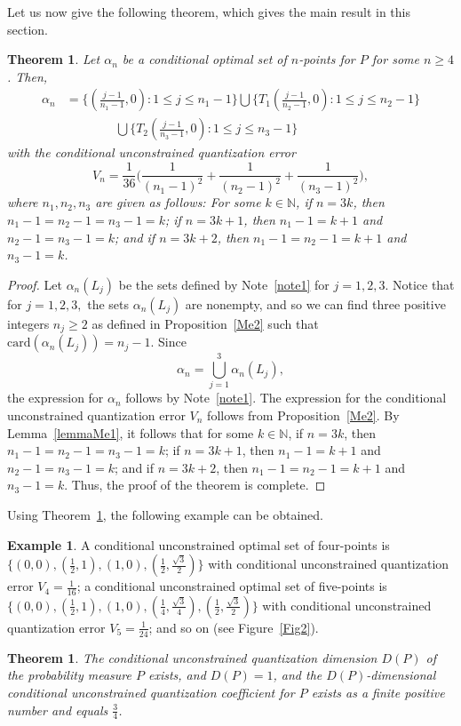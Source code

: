 \documentclass[12pt, reqno]{amsart}
\theoremstyle{plain}
\newtheorem{theorem}[subsection]{Theorem}
\newtheorem{theo}[subsection]{Theorem}
\theoremstyle{definition}
\newtheorem{exam}[subsection]{Example}
\newcommand{\UU}{\bigcup}%
\newcommand{\set}[1]{\{#1\}}%
\newcommand{\ga}{\alpha}
\newcommand{\D}[1]{\mathbb{#1}}%
\newcommand{\te}{\text}%
\begin{document}
Let us now give the following theorem, which gives the main result in this section. 
\begin{theo}\label{theo2}
Let $\ga_n$ be a conditional optimal set of $n$-points for $P$ for some $n\geq 4$. Then, 
\begin{align*}
\ga_n&=\Big\{(\frac{j-1}{n_1-1}, 0) : 1\leq j\leq n_1-1\Big\}\UU \Big\{T_1(\frac{j-1}{n_2-1}, 0) : 1\leq j\leq n_2-1\Big\}\\
&\qquad \qquad \UU\Big\{T_2(\frac{j-1}{n_3-1}, 0) : 1\leq j\leq n_3-1\Big\}
\end{align*} 
with the conditional unconstrained quantization error 
\[V_n=\frac{1}{36} \Big(\frac 1{(n_1-1)^2}+\frac 1{(n_2-1)^2}+\frac 1{(n_3-1)^2}\Big),\]
where $n_1, n_2, n_3$ are given as follows: For some $k\in \D N$, if $n=3k$, then $n_1-1=n_2-1=n_3-1=k$; if $n=3k+1$, then $n_1-1=k+1$ and $n_2-1=n_3-1=k$; and if $n=3k+2$, then $n_1-1=n_2-1=k+1$ and $n_3-1=k$. 
 \end{theo}
\begin{proof}
Let $\ga_n(L_j)$ be the sets defined by Note~\ref{note1} for $j=1, 2, 3$. Notice that for $j=1, 2, 3,$ the sets $\ga_n(L_j)$ are nonempty, and so we can find three positive integers $n_j\geq 2$ as defined in Proposition~\ref{Me2} such that $\te{card}(\ga_n(L_j))=n_j-1$.  Since 
\[\ga_n=\UU_{j=1}^3\ga_n(L_j),\]
the expression for $\ga_n$ follows by Note~\ref{note1}. The expression for the conditional unconstrained quantization error $V_n$ follows from Proposition~\ref{Me2}. By Lemma~\ref{lemmaMe1}, it follows that for some $k\in \D N$, if $n=3k$, then $n_1-1=n_2-1=n_3-1=k$; if $n=3k+1$, then $n_1-1=k+1$ and $n_2-1=n_3-1=k$; and if $n=3k+2$, then $n_1-1=n_2-1=k+1$ and $n_3-1=k$.  Thus, the proof of the theorem is complete. 
\end{proof}

Using Theorem~\ref{theo2}, the following example can be obtained. 
 \begin{exam} 
A conditional unconstrained optimal set of four-points is $\set{(0, 0), (\frac 12, 1), (1, 0), (\frac 12, \frac{\sqrt 3}2)}$ with conditional unconstrained quantization error $V_4=\frac 1 {16}$; a conditional unconstrained optimal set of five-points is $\set{(0, 0), (\frac 12, 1), (1, 0), (\frac 1 4, \frac{\sqrt 3}4), (\frac 12, \frac{\sqrt 3}2)}$ with conditional unconstrained quantization error $V_5=\frac 1 {24}$; and so on (see Figure~\ref{Fig2}).
 \end{exam} 
 
\begin{theorem}\label{theo3} 
The conditional unconstrained quantization dimension $D(P)$ of the probability measure $P$ exists, and $D(P)=1$, and the $D(P)$-dimensional conditional unconstrained quantization coefficient for $P$ exists as a finite positive number and equals $\frac 34$. 
\end{theorem}
\end{document}
